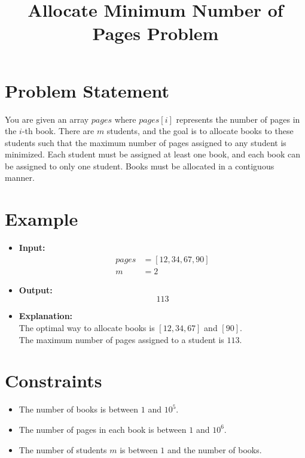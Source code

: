 \documentclass{article}
\begin{document}
\title{Allocate Minimum Number of Pages Problem}
\author{}
\date{}
\maketitle

\section*{Problem Statement}

You are given an array \(\textit{pages}\) where \(\textit{pages}[i]\) represents the number of pages in the \(i\)-th book. There are \(m\) students, and the goal is to allocate books to these students such that the maximum number of pages assigned to any student is minimized. Each student must be assigned at least one book, and each book can be assigned to only one student. Books must be allocated in a contiguous manner.

\section*{Example}

\begin{itemize}
    \item \textbf{Input:}
    \begin{align*}
        \textit{pages} & = [12, 34, 67, 90] \\
        m & = 2
    \end{align*}
    
    \item \textbf{Output:}
    \[
        113
    \]
    
    \item \textbf{Explanation:} \\
    The optimal way to allocate books is \([12, 34, 67]\) and \([90]\). \\
    The maximum number of pages assigned to a student is \(113\).
\end{itemize}

\section*{Constraints}

\begin{itemize}
    \item The number of books is between \(1\) and \(10^5\).
    \item The number of pages in each book is between \(1\) and \(10^6\).
    \item The number of students \(m\) is between \(1\) and the number of books.
\end{itemize}
\end{document}

